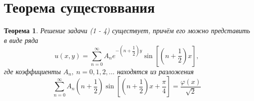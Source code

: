 \documentclass[a4paper, 11pt]{article}
\newtheorem{theorem}{Теорема}
\begin{document}
\section{Теорема сущестоввания}
\begin{theorem}
	Решение задачи (1 - 4) существует, причём его можно представить в виде ряда
	\begin{equation}
		u(x,y) = \sum\limits_{n=0}^{\infty} A_n e^{-\left(n + \dfrac12\right)y} \sin{\left[\left(n + \dfrac12\right)x\right]},
	\end{equation}
	где коэффициенты $A_n, \ n =0,1,2, \dots$ находятся из разложения
	\begin{equation}
		\sum\limits_{n=0}^{\infty} A_n \left(n + \dfrac12 \right) \sin{\left[\left(n +\dfrac12\right)x + \dfrac\pi4\right]} = \dfrac{\varphi(x)}{\sqrt2}
	\end{equation}
\end{theorem}
\end{document}
